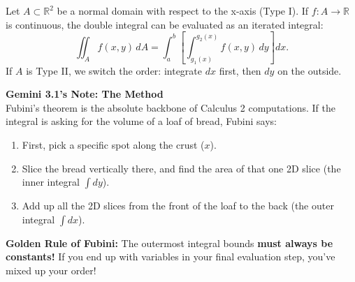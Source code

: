\begin{theorem*}
Let $A \subset \mathbb{R}^2$ be a normal domain with respect to the x-axis (Type I). If $f : A \to \mathbb{R}$ is continuous, the double integral can be evaluated as an iterated integral:
\[
\iint_A f(x, y) \, dA = \int_a^b \left[ \int_{g_1(x)}^{g_2(x)} f(x, y) \, dy \right] dx.
\]
If $A$ is Type II, we switch the order: integrate $dx$ first, then $dy$ on the outside.
\end{theorem*}

\begin{extra}
\textbf{Gemini 3.1's Note: The  Method}\\
Fubini's theorem is the absolute backbone of Calculus 2 computations. If the integral is asking for the volume of a loaf of bread, Fubini says: 
\begin{enumerate}
    \item First, pick a specific spot along the crust ($x$).
    \item Slice the bread vertically there, and find the area of that one 2D slice (the inner integral $\int dy$).
    \item Add up all the 2D slices from the front of the loaf to the back (the outer integral $\int dx$).
\end{enumerate}
\textbf{Golden Rule of Fubini:} The outermost integral bounds \textbf{must always be constants!} If you end up with variables in your final evaluation step, you've mixed up your order!
\end{extra}

